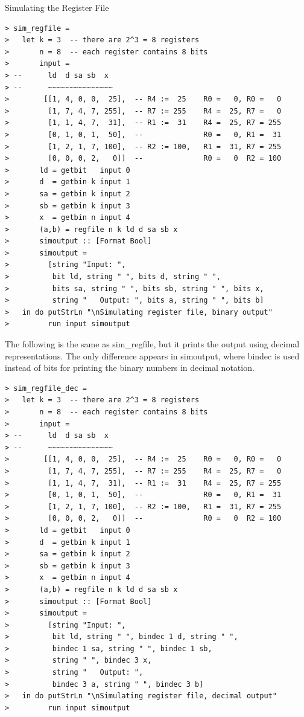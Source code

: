 \documentclass[a4paper,openany,fleqn]{book}
\begin{document}
Simulating the Register File

\begin{verbatim}
> sim_regfile =
>   let k = 3  -- there are 2^3 = 8 registers
>       n = 8  -- each register contains 8 bits
>       input =
> --      ld  d sa sb  x
> --      ~~~~~~~~~~~~~~~
>        [[1, 4, 0, 0,  25],  -- R4 :=  25    R0 =   0, R0 =   0
>         [1, 7, 4, 7, 255],  -- R7 := 255    R4 =  25, R7 =   0
>         [1, 1, 4, 7,  31],  -- R1 :=  31    R4 =  25, R7 = 255
>         [0, 1, 0, 1,  50],  --              R0 =   0, R1 =  31
>         [1, 2, 1, 7, 100],  -- R2 := 100,   R1 =  31, R7 = 255
>         [0, 0, 0, 2,   0]]  --              R0 =   0  R2 = 100
>       ld = getbit   input 0
>       d  = getbin k input 1
>       sa = getbin k input 2
>       sb = getbin k input 3
>       x  = getbin n input 4
>       (a,b) = regfile n k ld d sa sb x
>       simoutput :: [Format Bool]
>       simoutput =
>         [string "Input: ",
>          bit ld, string " ", bits d, string " ",
>          bits sa, string " ", bits sb, string " ", bits x,
>          string "   Output: ", bits a, string " ", bits b]
>   in do putStrLn "\nSimulating register file, binary output"
>         run input simoutput
\end{verbatim}

The following is the same as sim\_regfile, but it prints the output
using decimal representations.  The only difference appears in
simoutput, where bindec is used instead of bits for printing the binary
numbers in decimal notation.

\begin{verbatim}
> sim_regfile_dec =
>   let k = 3  -- there are 2^3 = 8 registers
>       n = 8  -- each register contains 8 bits
>       input =
> --      ld  d sa sb  x
> --      ~~~~~~~~~~~~~~~
>        [[1, 4, 0, 0,  25],  -- R4 :=  25    R0 =   0, R0 =   0
>         [1, 7, 4, 7, 255],  -- R7 := 255    R4 =  25, R7 =   0
>         [1, 1, 4, 7,  31],  -- R1 :=  31    R4 =  25, R7 = 255
>         [0, 1, 0, 1,  50],  --              R0 =   0, R1 =  31
>         [1, 2, 1, 7, 100],  -- R2 := 100,   R1 =  31, R7 = 255
>         [0, 0, 0, 2,   0]]  --              R0 =   0  R2 = 100
>       ld = getbit   input 0
>       d  = getbin k input 1
>       sa = getbin k input 2
>       sb = getbin k input 3
>       x  = getbin n input 4
>       (a,b) = regfile n k ld d sa sb x
>       simoutput :: [Format Bool]
>       simoutput =
>         [string "Input: ",
>          bit ld, string " ", bindec 1 d, string " ",
>          bindec 1 sa, string " ", bindec 1 sb,
>          string " ", bindec 3 x,
>          string "   Output: ",
>          bindec 3 a, string " ", bindec 3 b]
>   in do putStrLn "\nSimulating register file, decimal output"
>         run input simoutput
\end{verbatim}
\end{document}

